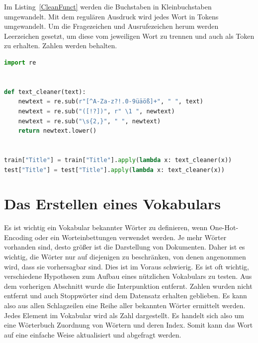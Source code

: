 Im Listing~\ref{CleanFunct} werden die Buchstaben in Kleinbuchstaben umgewandelt. Mit dem regulären Ausdruck wird jedes Wort in Tokens umgewandelt. Um die Fragezeichen und Ausrufezeichen herum werden Leerzeichen gesetzt, um diese vom jeweiligen Wort zu trennen und auch als Token zu erhalten. Zahlen werden behalten.

\begin{lstlisting}[language=Python,caption=Die Preprocessing-Funktion, label={CleanFunct}]
import re


def text_cleaner(text):
    newtext = re.sub(r"[^A-Za-z?!.0-9üäöß]+", " ", text)
    newtext = re.sub("([!?])", r" \1 ", newtext)
    newtext = re.sub("\s{2,}", " ", newtext)
    return newtext.lower()
    
    
train["Title"] = train["Title"].apply(lambda x: text_cleaner(x))
test["Title"] = test["Title"].apply(lambda x: text_cleaner(x))
\end{lstlisting}

\section{Das Erstellen eines Vokabulars} \label{vocSec}


Es ist wichtig ein Vokabular bekannter Wörter zu definieren, wenn One-Hot-Encoding oder ein Worteinbettungen verwendet werden. Je mehr Wörter vorhanden sind, desto größer ist die Darstellung von Dokumenten. Daher ist es wichtig, die Wörter nur auf diejenigen zu beschränken, von denen angenommen wird, dass sie vorhersagbar sind. Dies ist im Voraus schwierig. Es ist oft wichtig, verschiedene Hypothesen zum Aufbau eines nützlichen Vokabulars zu testen. Aus dem vorherigen Abschnitt wurde die Interpunktion entfernt. Zahlen wurden nicht entfernt und auch Stoppwörter sind dem Datensatz erhalten geblieben. Es kann also aus allen Schlagzeilen eine Reihe aller bekannten Wörter ermittelt werden. Jedes Element im Vokabular wird als Zahl dargestellt. Es handelt sich also um eine Wörterbuch Zuordnung von Wörtern und deren Index. Somit kann das Wort auf eine einfache Weise aktualisiert und abgefragt werden.

